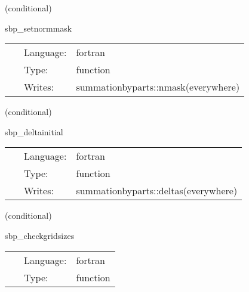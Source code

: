    (conditional) 

\hspace{5mm} sbp\_setnormmask 

\hspace{5mm}{\it setup the mask for the calculation of the norm } 


\hspace{5mm}

 \begin{tabular*}{160mm}{cll} 
~ & Language:  & fortran \\ 
~ & Type:  & function \\ 
~ & Writes:  & summationbyparts::nmask(everywhere) \\ 
\end{tabular*} 


\vspace{5mm}

   (conditional) 

\hspace{5mm} sbp\_deltainitial 

\hspace{5mm}{\it initialize dissipation deltas } 


\hspace{5mm}

 \begin{tabular*}{160mm}{cll} 
~ & Language:  & fortran \\ 
~ & Type:  & function \\ 
~ & Writes:  & summationbyparts::deltas(everywhere) \\ 
\end{tabular*} 


\vspace{5mm}

   (conditional) 

\hspace{5mm} sbp\_checkgridsizes 

\hspace{5mm}{\it check grid sizes and ghost zones } 


\hspace{5mm}

 \begin{tabular*}{160mm}{cll} 
~ & Language:  & fortran \\ 
~ & Type:  & function \\ 
\end{tabular*} 


\vspace{5mm}

